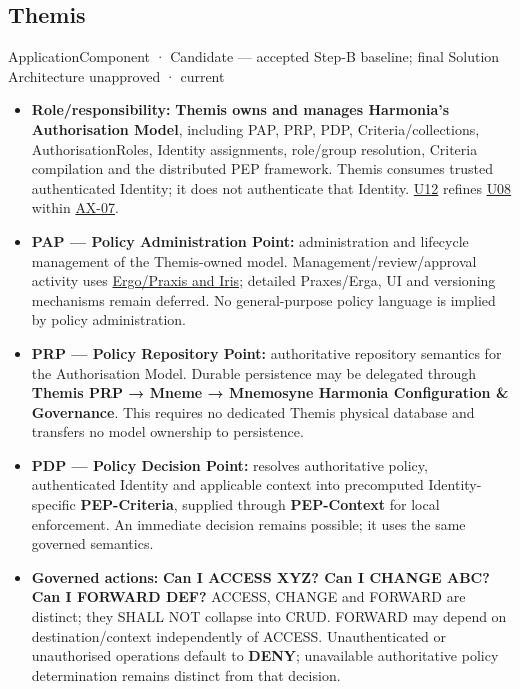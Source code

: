 \subsection{Themis}

\label{element:899d34ec491948b68aad09e507dea6d1}
{\small ApplicationComponent · Candidate — accepted Step-B baseline; final Solution Architecture unapproved · current}\par

\begin{itemize}


\item \textbf{Role/responsibility:} \textbf{Themis owns and manages Harmonia's Authorisation
  Model}, including PAP, PRP, PDP, Criteria/collections, AuthorisationRoles,
  Identity assignments, role/group resolution, Criteria compilation and the
  distributed PEP framework. Themis consumes trusted authenticated Identity;
  it does not authenticate that Identity. \href{\detokenize{../../../../../docs/markdown/05-information-systems-architecture/sources.md#u12}}{U12} refines
  \href{\detokenize{../../../../../docs/markdown/05-information-systems-architecture/sources.md#u08}}{U08} within \hyperref[element:5de2ae2c3b794c2d9f3a14efd51d564f]{AX-07}.

\item \textbf{PAP — Policy Administration Point:} administration and lifecycle management
  of the Themis-owned model. Management/review/approval activity uses
  \href{\detokenize{../../../../../docs/markdown/05-information-systems-architecture/component-register.md#authorisation-administration}}{Ergo/Praxis and Iris}; detailed Praxes/Erga,
  UI and versioning mechanisms remain deferred. No general-purpose policy
  language is implied by policy administration.

\item \textbf{PRP — Policy Repository Point:} authoritative repository semantics for the
  Authorisation Model. Durable persistence may be delegated through \textbf{Themis PRP
  → Mneme → Mnemosyne Harmonia Configuration \& Governance}. This requires no
  dedicated Themis physical database and transfers no model ownership to persistence.

\item \textbf{PDP — Policy Decision Point:} resolves authoritative policy, authenticated
  Identity and applicable context into precomputed Identity-specific
  \textbf{PEP-Criteria}, supplied through \textbf{PEP-Context} for local enforcement.
  An immediate decision remains possible; it uses the same governed semantics.

\item \textbf{Governed actions:} \textbf{Can I ACCESS XYZ? Can I CHANGE ABC? Can I FORWARD DEF?}
  ACCESS, CHANGE and FORWARD are distinct; they SHALL NOT collapse into CRUD.
  FORWARD may depend on destination/context independently of ACCESS.
  Unauthenticated or unauthorised operations default to \textbf{DENY}; unavailable
  authoritative policy determination remains distinct from that decision.

\end{itemize}






